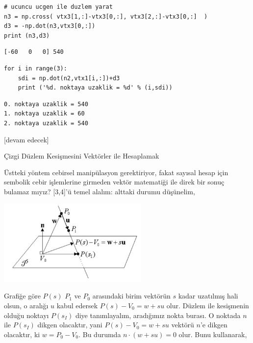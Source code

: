 \documentclass[12pt,fleqn]{article}\usepackage{../../common}
\begin{document}
\begin{verbatim}
# ucuncu ucgen ile duzlem yarat
n3 = np.cross( vtx3[1,:]-vtx3[0,:], vtx3[2,:]-vtx3[0,:]  )
d3 = -np.dot(n3,vtx3[0,:])
print (n3,d3)
\end{verbatim}

\begin{verbatim}
[-60   0   0] 540
\end{verbatim}

\begin{verbatim}
for i in range(3):
    sdi = np.dot(n2,vtx1[i,:])+d3
    print ('%d. noktaya uzaklik = %d' % (i,sdi))
\end{verbatim}

\begin{verbatim}
0. noktaya uzaklik = 540
1. noktaya uzaklik = 60
2. noktaya uzaklik = 540
\end{verbatim}













[devam edecek]

Çizgi Düzlem Kesişmesini Vektörler ile Hesaplamak

Üstteki yöntem cebirsel manipülasyon gerektiriyor, fakat sayısal hesap için
sembolik cebir işlemlerine girmeden vektör matematiği ile direk bir sonuç
bulamaz mıyız? [3,4]'ü temel alalım: alttaki durumu düşünelim, 

\includegraphics[width=20em]{calc_multi_75_app_06.jpg}

Grafiğe göre $P(s)$ $P_1$ ve $P_0$ arasındaki birim vektörün $s$ kadar
uzatılmış hali olsun, o aralığı $u$ kabul edersek $P(s)-V_0 = w + su$
olur. Düzlem ile kesişmenin olduğu noktayı $P(s_I)$ diye tanımlayalım,
aradığımız nokta burası. O noktada $n$ ile $P(s_I)$ dikgen olacaktır, yani
$P(s) - V_0 = w + su$ vektörü $n$'e dikgen olacaktır, ki $w=P_0-V_0$. Bu
durumda $n \cdot (w+su) = 0$ olur. Bunu kullanarak,
\end{document}
